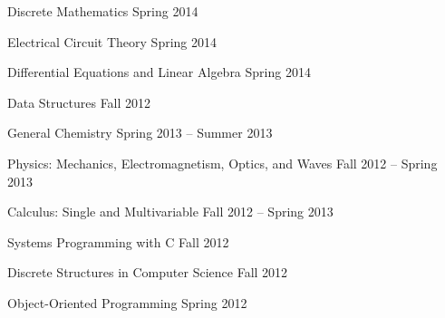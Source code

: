 \documentclass[letterpaper,MMMyyyy,nonstopmode]{simpleresumecv}
\begin{document}
\begin{Body}
\BulletItem
Discrete Mathematics
\hfill Spring 2014

\BulletItem
Electrical Circuit Theory
\hfill Spring 2014

\BulletItem
Differential Equations and Linear Algebra
\hfill Spring 2014

\BulletItem
Data Structures
\hfill Fall 2012

\BigGap

\BulletItem
General Chemistry
\hfill Spring 2013 -- Summer 2013

\BulletItem
Physics: Mechanics, Electromagnetism, Optics, and Waves
\hfill Fall 2012 -- Spring 2013

\BulletItem
Calculus: Single and Multivariable
\hfill Fall 2012 -- Spring 2013

\BulletItem
Systems Programming with C
\hfill Fall 2012

\BulletItem
Discrete Structures in Computer Science
\hfill Fall 2012

\BulletItem
Object-Oriented Programming
\hfill Spring 2012

\end{Body}
\end{document}
